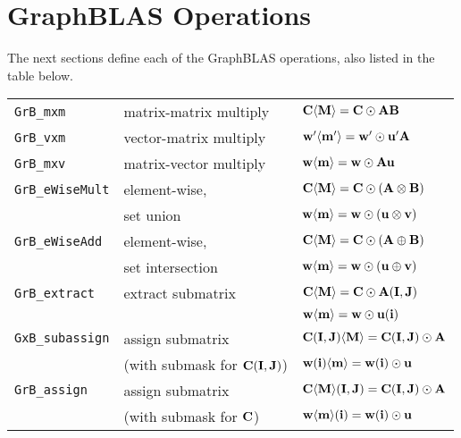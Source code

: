 \documentclass[12pt]{article}
\begin{document}
\newpage
\section{GraphBLAS Operations} %
\label{operations}

The next sections define each of the GraphBLAS operations, also listed in
the table below.

\vspace{0.2in}
{\small
\begin{tabular}{lll}
\hline
\verb'GrB_mxm'       & matrix-matrix multiply  & ${\bf C \langle M \rangle = C \odot AB}$ \\
\verb'GrB_vxm'       & vector-matrix multiply  & ${\bf w'\langle m'\rangle = w'\odot u'A}$ \\
\verb'GrB_mxv'       & matrix-vector multiply  & ${\bf w \langle m \rangle = w \odot Au}$ \\
\hline
\verb'GrB_eWiseMult' & element-wise,           & ${\bf C \langle M \rangle = C \odot (A \otimes B)}$ \\
                     & set union               & ${\bf w \langle m \rangle = w \odot (u \otimes v)}$ \\
\hline
\verb'GrB_eWiseAdd'  & element-wise,           & ${\bf C \langle M \rangle = C \odot (A \oplus  B)}$ \\
                     & set intersection        & ${\bf w \langle m \rangle = w \odot (u \oplus  v)}$ \\
\hline
\verb'GrB_extract'   & extract submatrix       & ${\bf C \langle M \rangle = C \odot A(I,J)}$ \\
                     &                         & ${\bf w \langle m \rangle = w \odot u(i)}$ \\
\hline
\verb'GxB_subassign' & assign submatrix        & ${\bf C (I,J) \langle M \rangle = C(I,J) \odot A}$ \\
                     & (with submask for ${\bf C(I,J)}$)
                                               & ${\bf w (i)   \langle m \rangle = w(i)   \odot u}$ \\
\hline
\verb'GrB_assign'    & assign submatrix        & ${\bf C \langle M \rangle (I,J) = C(I,J) \odot A}$ \\
                     & (with submask for ${\bf C}$)
                                               & ${\bf w \langle m \rangle (i)   = w(i)   \odot u}$ \\

\end{tabular}}
\end{document}

